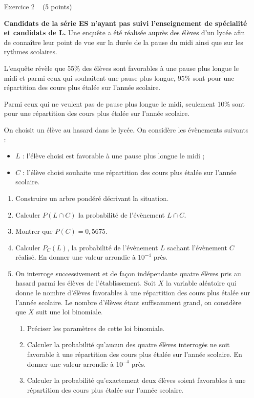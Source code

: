 
%
\begin{h2}Exercice 2   (5 points)\end{h2}
\textbf{Candidats de la série ES n'ayant pas suivi l'enseignement de spécialité et candidats de L.}
Une enquête a été réalisée auprès des élèves d'un lycée afin de connaître leur point de vue sur la durée de la pause du midi ainsi que sur les rythmes scolaires.
\par
L'enquête révèle que 55\% des élèves sont favorables à une pause plus longue le midi et parmi ceux qui souhaitent une pause plus longue, 95\% sont pour une répartition des cours plus étalée sur l'année scolaire.
\par
Parmi ceux qui ne veulent pas de pause plus longue le midi, seulement 10\% sont pour une répartition des cours plus étalée sur l'année scolaire.
\par
On choisit un élève au hasard dans le lycée. On considère les évènements suivants :
\begin{itemize}
     \item
     $L$ : l'élève choisi est favorable à une pause plus longue le midi ;
     \item
     $C$ : l'élève choisi souhaite une répartition des cours plus étalée sur l'année scolaire.
\end{itemize}
\begin{enumerate}
     \item
     Construire un arbre pondéré décrivant la situation.
     \item
     Calculer $P\left(L \cap C\right)$ la probabilité de l'évènement $L \cap C$.
     \item
     Montrer que $P\left(C\right)=0,5675$.
     \item
     Calculer $P_{C}\left(L\right)$, la probabilité de l'évènement $L$ sachant l'évènement $C$ réalisé. En donner une valeur arrondie à $10^{-4}$ près.
     \item
     On interroge successivement et de façon indépendante quatre élèves pris au hasard parmi les élèves de l'établissement. Soit $X$ la variable aléatoire qui donne le nombre d'élèves favorables à une répartition des cours plus étalée sur l'année scolaire. Le nombre d'élèves étant suffisamment grand, on considère que $X$ suit une loi binomiale.
     \begin{enumerate}[label=\alph*.]
          \item
          Préciser les paramètres de cette loi binomiale.
          \item
          Calculer la probabilité qu'aucun des quatre élèves interrogés ne soit favorable à une répartition des cours plus étalée sur l'année scolaire. En donner une valeur arrondie à $10^{-4}$ près.
          \item
          Calculer la probabilité qu'exactement deux élèves soient favorables à une répartition des cours plus étalée sur l'année scolaire.
     \end{enumerate}
\end{enumerate}
